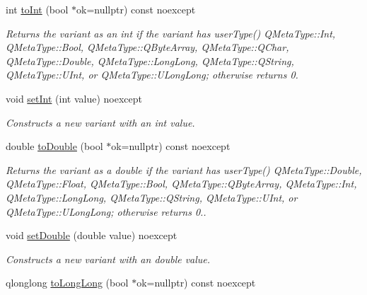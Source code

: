 \begin{DoxyCompactItemize}
\item 
int \hyperlink{class_variant_a832bfdf3d791497b776c67b322fec871}{to\+Int} (bool $\ast$ok=nullptr) const noexcept
\begin{DoxyCompactList}\small\item\em Returns the variant as an int if the variant has user\+Type() Q\+Meta\+Type\+::\+Int, Q\+Meta\+Type\+::\+Bool, Q\+Meta\+Type\+::\+Q\+Byte\+Array, Q\+Meta\+Type\+::\+Q\+Char, Q\+Meta\+Type\+::\+Double, Q\+Meta\+Type\+::\+Long\+Long, Q\+Meta\+Type\+::\+Q\+String, Q\+Meta\+Type\+::\+U\+Int, or Q\+Meta\+Type\+::\+U\+Long\+Long; otherwise returns 0. \end{DoxyCompactList}\item 
\mbox{\label{class_variant_ad1797f20d9396d3ddaf24b16453e3534}} 
void \hyperlink{class_variant_ad1797f20d9396d3ddaf24b16453e3534}{set\+Int} (int value) noexcept
\begin{DoxyCompactList}\small\item\em Constructs a new variant with an int value. \end{DoxyCompactList}\item 
double \hyperlink{class_variant_a17e4fd1648eb98fdc0a68302c392a216}{to\+Double} (bool $\ast$ok=nullptr) const noexcept
\begin{DoxyCompactList}\small\item\em Returns the variant as a double if the variant has user\+Type() Q\+Meta\+Type\+::\+Double, Q\+Meta\+Type\+::\+Float, Q\+Meta\+Type\+::\+Bool, Q\+Meta\+Type\+::\+Q\+Byte\+Array, Q\+Meta\+Type\+::\+Int, Q\+Meta\+Type\+::\+Long\+Long, Q\+Meta\+Type\+::\+Q\+String, Q\+Meta\+Type\+::\+U\+Int, or Q\+Meta\+Type\+::\+U\+Long\+Long; otherwise returns 0.. \end{DoxyCompactList}\item 
\mbox{\label{class_variant_a6af0bb75e0612a13cb0880f0cec9a870}} 
void \hyperlink{class_variant_a6af0bb75e0612a13cb0880f0cec9a870}{set\+Double} (double value) noexcept
\begin{DoxyCompactList}\small\item\em Constructs a new variant with an double value. \end{DoxyCompactList}\item 
qlonglong \hyperlink{class_variant_a4181b7ff9d27ae4936a6e91c9a9d7e26}{to\+Long\+Long} (bool $\ast$ok=nullptr) const noexcept

\end{DoxyCompactItemize}
